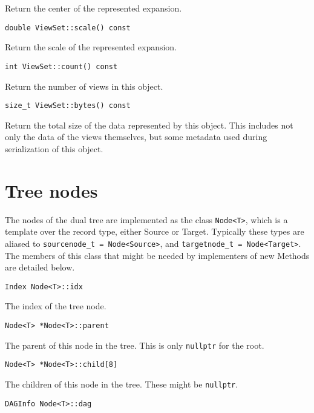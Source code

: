 \noindent Return the center of the represented expansion.

\begin{lstlisting}
double ViewSet::scale() const
\end{lstlisting}

\noindent Return the scale of the represented expansion.

\begin{lstlisting}
int ViewSet::count() const
\end{lstlisting}

\noindent Return the number of views in this object.

\begin{lstlisting}
size_t ViewSet::bytes() const
\end{lstlisting}

\noindent Return the total size of the data represented by this object. This
includes not only the data of the views themselves, but some metadata used
during serialization of this object.


\section{Tree nodes}

The nodes of the dual tree are implemented as the class \texttt{Node<T>}, which
is a template over the record type, either Source or Target. Typically these
types are aliased to \texttt{sourcenode\_t = Node<Source>}, and
\texttt{targetnode\_t = Node<Target>}. The members of this class that might be
needed by implementers of new Methods are detailed below.

\begin{lstlisting}
Index Node<T>::idx
\end{lstlisting}

\noindent The index of the tree node.

\begin{lstlisting}
Node<T> *Node<T>::parent
\end{lstlisting}

\noindent The parent of this node in the tree. This is only \texttt{nullptr} for
the root.

\begin{lstlisting}
Node<T> *Node<T>::child[8]
\end{lstlisting}

\noindent The children of this node in the tree. These might be
\texttt{nullptr}.

\begin{lstlisting}
DAGInfo Node<T>::dag
\end{lstlisting}


